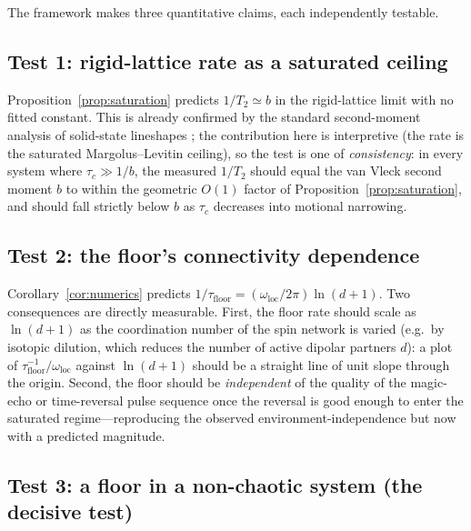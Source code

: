 \documentclass[twocolumn,10pt,a4paper]{article}
\theoremstyle{thmstyle}
\theoremstyle{definition}
\theoremstyle{remark}
\newcommand{\Ttwo}{T_{2}}
\begin{document}
The framework makes three quantitative claims, each independently
testable.

\subsection{Test 1: rigid-lattice rate as a saturated ceiling}

Proposition~\ref{prop:saturation} predicts $1/\Ttwo\simeq b$ in the
rigid-lattice limit with no fitted constant. This is already confirmed by
the standard second-moment analysis of solid-state lineshapes
\citep{abragam1961,anderson1953}; the contribution here is interpretive
(the rate is the saturated Margolus--Levitin ceiling), so the test is one
of \emph{consistency}: in every system where $\tau_{c}\gg 1/b$, the measured
$1/\Ttwo$ should equal the van Vleck second moment $b$ to within the
geometric $O(1)$ factor of Proposition~\ref{prop:saturation}, and should
fall strictly below $b$ as $\tau_{c}$ decreases into motional narrowing.

\subsection{Test 2: the floor's connectivity dependence}

Corollary~\ref{cor:numerics} predicts $1/\tau_{\mathrm{floor}}=
(\omega_{\mathrm{loc}}/2\pi)\ln(d+1)$. Two consequences are directly
measurable. First, the floor rate should scale as $\ln(d+1)$ as the
coordination number of the spin network is varied (e.g.\ by isotopic
dilution, which reduces the number of active dipolar partners $d$): a plot
of $\tau_{\mathrm{floor}}^{-1}/\omega_{\mathrm{loc}}$ against $\ln(d+1)$
should be a straight line of unit slope through the origin. Second, the
floor should be \emph{independent} of the quality of the magic-echo or
time-reversal pulse sequence once the reversal is good enough to enter the
saturated regime---reproducing the observed environment-independence
\citep{pastawski2000} but now with a predicted magnitude.

\subsection{Test 3: a floor in a non-chaotic system (the decisive test)}
\end{document}
